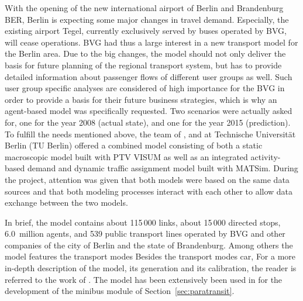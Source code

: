 With the opening of the new international airport of Berlin and Brandenburg BER,
Berlin is expecting some major changes in travel demand. Especially, the
existing airport Tegel, currently exclusively served by buses operated by BVG,
will cease operations. BVG had thus a large interest in a new transport model
for the Berlin area. Due to the big changes, the model should not only deliver
the basis for future planning of the regional transport system, but has to
provide detailed information about passenger flows of different user groups as
well. Such user group specific analyses are considered of high importance for
the BVG in order to provide a basis for their future business strategies, which
is why an agent-based model was specifically requested. Two scenarios were
actually asked for, one for the year 2008 (actual state), and one for the year
2015 (prediction). To fulfill the needs mentioned above, the team of 
\citet{PTV2013}, \citet{Senozon2013} and \citet{VSP2013} at Technische Universität Berlin (TU Berlin)
offered a combined model consisting of both a static macroscopic model built with
PTV VISUM \citep{VISUM2013} as well as an integrated activity-based demand and
dynamic traffic assignment model built with MATSim. During
the project, attention was given that both models were based on the same data
sources and that both modeling processes interact with each other to allow data
exchange between the two models.

In brief, the model contains about 115\,000 links, %
about 15\,000 directed stops, %
6.0~million agents, %
and 539 public transport lines operated by BVG and other companies of the city
of Berlin and the state of Brandenburg. Among others the model features the transport modes Besides the transport modes car, For a more in-depth description of the
model, its generation and its calibration, the reader is referred to the work of
\cite{NeumannEtAl2014IatbrPtBerlinBook}. The model has been extensively been used in \citet[][Ch 7/8]{Neumann2014PhD} for the development of the minibus module of Section~\ref{sec:paratransit}.

%
